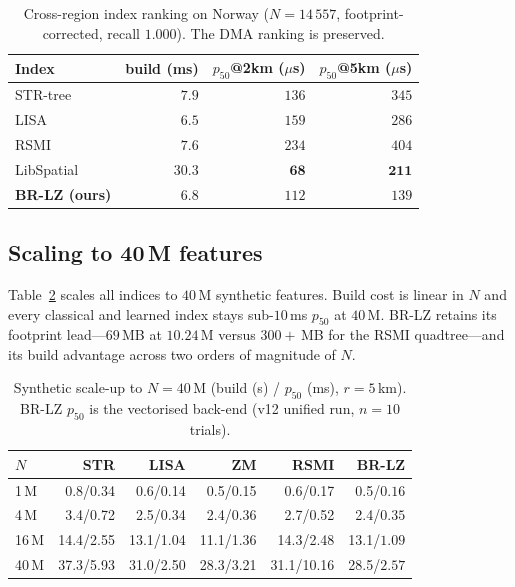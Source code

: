 \begin{table}[t]
\centering
\caption{Cross-region index ranking on Norway ($N{=}14\,557$,
footprint-corrected, recall $1.000$). The DMA ranking is
preserved.}\label{tab:region}
\small
\begin{tabular}{lrrr}
\toprule
Index & build (ms) & $p_{50}$@2km ($\mu$s) & $p_{50}$@5km ($\mu$s) \\
\midrule
STR-tree     & $7.9$  & $136$ & $345$ \\
LISA         & $6.5$  & $159$ & $286$ \\
RSMI         & $7.6$  & $234$ & $404$ \\
LibSpatial   & $30.3$ & $\mathbf{68}$ & $\mathbf{211}$ \\
\textbf{BR-LZ (ours)} & $\mathbf{6.8}$ & $112$ & $139$ \\
\bottomrule
\end{tabular}
\end{table}

\subsection{Scaling to 40\,M features}\label{ssec:scale}
Table~\ref{tab:scale} scales all indices to $40$\,M synthetic features.
Build cost is linear in $N$ and every classical and learned index stays
sub-$10$\,ms $p_{50}$ at $40$\,M. BR-LZ retains its footprint
lead---$69$\,MB at $10.24$\,M versus $300{+}$\,MB for the RSMI
quadtree---and its build advantage across two orders of magnitude of $N$.

\begin{table}[t]
\centering
\caption{Synthetic scale-up to $N{=}40$\,M (build (s) / $p_{50}$ (ms), $r{=}5$\,km).  BR-LZ $p_{50}$ is the vectorised back-end (v12 unified run, $n{=}10$ trials).}\label{tab:scale}
\setlength{\tabcolsep}{3pt}
\small
\begin{tabular}{lrrrrr}
\toprule
$N$    & STR & LISA & ZM & RSMI & BR-LZ \\
\midrule
1\,M   & 0.8/0.34  & 0.6/0.14  & 0.5/0.15  & 0.6/0.17   & 0.5/$\mathbf{0.16}$ \\
4\,M   & 3.4/0.72  & 2.5/0.34  & 2.4/0.36  & 2.7/0.52   & 2.4/$\mathbf{0.35}$ \\
16\,M  & 14.4/2.55 & 13.1/1.04 & 11.1/1.36 & 14.3/2.48  & 13.1/$\mathbf{1.09}$ \\
40\,M  & 37.3/5.93 & 31.0/2.50 & 28.3/3.21 & 31.1/10.16 & 28.5/$\mathbf{2.57}$ \\
\bottomrule
\end{tabular}
\setlength{\tabcolsep}{6pt}
\end{table}


